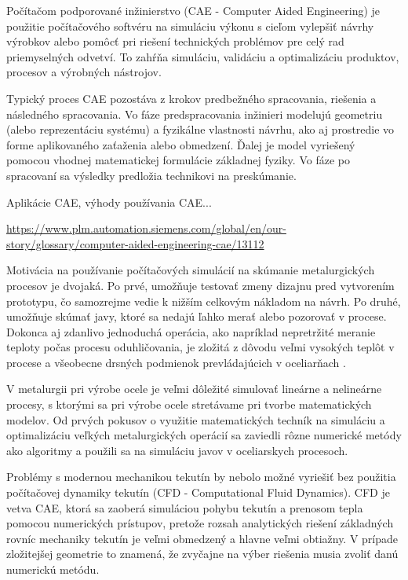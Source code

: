\documentclass[]{tukediphc}
\begin{document}
Počítačom podporované inžinierstvo (CAE - Computer Aided Engineering) je použitie počítačového softvéru na simuláciu výkonu s cieľom vylepšiť návrhy výrobkov alebo pomôcť pri riešení technických problémov pre celý rad priemyselných odvetví. To zahŕňa simuláciu, validáciu a optimalizáciu produktov, procesov a výrobných nástrojov.

Typický proces CAE pozostáva z krokov predbežného spracovania, riešenia a následného spracovania. Vo fáze predspracovania inžinieri modelujú geometriu (alebo reprezentáciu systému) a fyzikálne vlastnosti návrhu, ako aj prostredie vo forme aplikovaného zaťaženia alebo obmedzení. Ďalej je model vyriešený pomocou vhodnej matematickej formulácie základnej fyziky. Vo fáze po spracovaní sa výsledky predložia technikovi na preskúmanie.

Aplikácie CAE, výhody používania CAE...

\url{https://www.plm.automation.siemens.com/global/en/our-story/glossary/computer-aided-engineering-cae/13112}

Motivácia na používanie počítačových simulácií na skúmanie metalurgických procesov je dvojaká. Po prvé, umožňuje testovať zmeny dizajnu pred vytvorením prototypu, čo samozrejme vedie k nižším celkovým nákladom na návrh. Po druhé, umožňuje skúmať javy, ktoré sa nedajú ľahko merať alebo pozorovať v procese. Dokonca aj zdanlivo jednoduchá operácia, ako napríklad nepretržité meranie teploty počas procesu oduhličovania, je zložitá z dôvodu veľmi vysokých teplôt v procese a všeobecne drsných podmienok prevládajúcich v oceliarňach \citep{Ersson2018}.




V metalurgii pri výrobe ocele je veľmi dôležité simulovať lineárne a nelineárne procesy, s ktorými sa pri výrobe ocele stretávame pri tvorbe matematických modelov. Od prvých pokusov o využitie matematických techník na simuláciu a optimalizáciu veľkých metalurgických operácií sa zaviedli rôzne numerické metódy ako algoritmy a použili sa na simuláciu javov v oceliarskych procesoch.

Problémy s modernou mechanikou tekutín by nebolo možné vyriešiť bez použitia počítačovej dynamiky tekutín (CFD - Computational Fluid Dynamics). CFD je vetva CAE, ktorá sa zaoberá simuláciou pohybu tekutín a prenosom tepla pomocou numerických prístupov, pretože rozsah analytických riešení základných rovníc mechaniky tekutín je veľmi obmedzený a hlavne veľmi obtiažny. V prípade zložitejšej geometrie to znamená, že zvyčajne na výber riešenia musia zvoliť danú numerickú metódu. 
\end{document}
